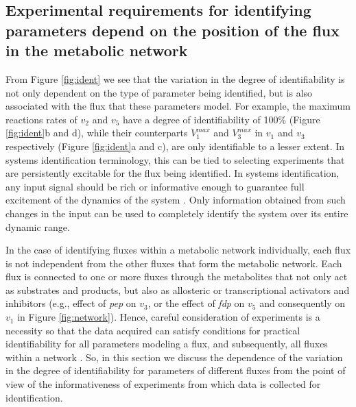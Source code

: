 \documentclass[10pt]{article}
\begin{document}
	\subsection{Experimental requirements for identifying parameters depend on the position of the flux in the metabolic network}\label{sec:experiment_type}		
	From Figure \ref{fig:ident} we see that the variation in the degree of identifiability is not only dependent on the type of parameter being identified, but is also associated with the flux that these parameters model. For example, the maximum reactions rates of $v_2$ and $v_5$ have a degree of identifiability of 100\% (Figure \ref{fig:ident}b and d), while their counterparts $V_1^{max}$ and $V_3^{max}$ in $v_1$ and $v_3$ respectively (Figure \ref{fig:ident}a and c), are only identifiable to a lesser extent.	
	In systems identification terminology, this can be tied to selecting experiments that are persistently excitable for the flux being identified. In systems identification, any input signal should be rich or informative enough to guarantee full excitement of the dynamics of the system \parencite{Ljung1994}. Only information obtained from such changes in the input can be used to completely identify the system over its entire dynamic range. %
	
	In the case of identifying fluxes within a metabolic network individually, each flux is not independent from the other fluxes that form the metabolic network. Each flux is connected to one or more fluxes through the metabolites that not only act as substrates and products, but also as allosteric or transcriptional activators and inhibitors (e.g., effect of \textit{pep} on $v_3$, or the effect of \textit{fdp} on $v_5$ and consequently on $v_1$ in Figure \ref{fig:network}). Hence, careful consideration of experiments is a necessity so that the data acquired can satisfy conditions for practical identifiability for all parameters modeling a flux, and subsequently, all fluxes within a network \parencite{Heijnen2013}. So, in this section we discuss the dependence of the variation in the degree of identifiability for parameters of different fluxes from the point of view of the informativeness of experiments from which data is collected for identification.	
	
\end{document}
